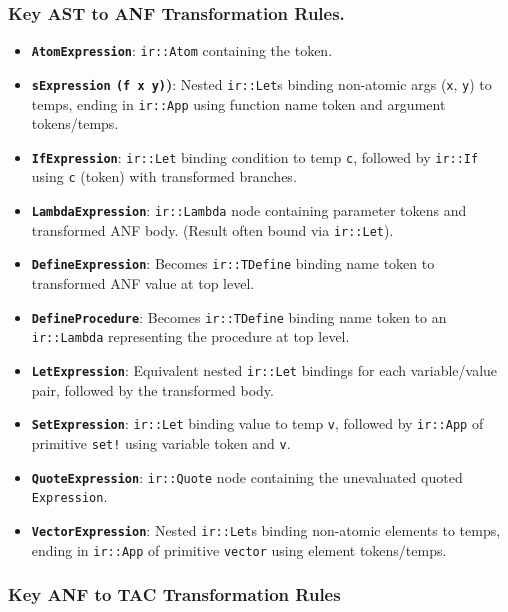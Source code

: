 \documentclass[final]{cmpreport_02}
\begin{document}
\label{app:anf-table}
\subsubsection*{Key AST to ANF Transformation Rules.}
\label{tab:anf-transformations-appendix}
\begin{itemize}
    \item \textbf{\texttt{AtomExpression}}: \texttt{ir::Atom} containing the token.
    \item \textbf{\texttt{sExpression} \texttt{(f x y)})}: Nested \texttt{ir::Let}s binding non-atomic args (\texttt{x}, \texttt{y}) to temps, ending in \texttt{ir::App} using function name token and argument tokens/temps.
    \item \textbf{\texttt{IfExpression}}: \texttt{ir::Let} binding condition to temp \texttt{c}, followed by \texttt{ir::If} using \texttt{c} (token) with transformed branches.
    \item \textbf{\texttt{LambdaExpression}}: \texttt{ir::Lambda} node containing parameter tokens and transformed ANF body. (Result often bound via \texttt{ir::Let}).
    \item \textbf{\texttt{DefineExpression}}: Becomes \texttt{ir::TDefine} binding name token to transformed ANF value at top level.
    \item \textbf{\texttt{DefineProcedure}}: Becomes \texttt{ir::TDefine} binding name token to an \linebreak\texttt{ir::Lambda} representing the procedure at top level.
    \item \textbf{\texttt{LetExpression}}: Equivalent nested \texttt{ir::Let} bindings for each variable/value pair, followed by the transformed body.
    \item \textbf{\texttt{SetExpression}}: \texttt{ir::Let} binding value to temp \texttt{v}, followed by \texttt{ir::App} of primitive \texttt{set!} using variable token and \texttt{v}.
    \item \textbf{\texttt{QuoteExpression}}: \texttt{ir::Quote} node containing the unevaluated quoted \texttt{Expression}.
    \item \textbf{\texttt{VectorExpression}}: Nested \texttt{ir::Let}s binding non-atomic elements to temps, ending in \texttt{ir::App} of primitive \texttt{vector} using element tokens/temps.
\end{itemize}

\label{app:tac-table} 

\subsubsection*{Key ANF to TAC Transformation Rules}
\label{tab:anf-to-tac-transformations-appendix}
\end{document}
